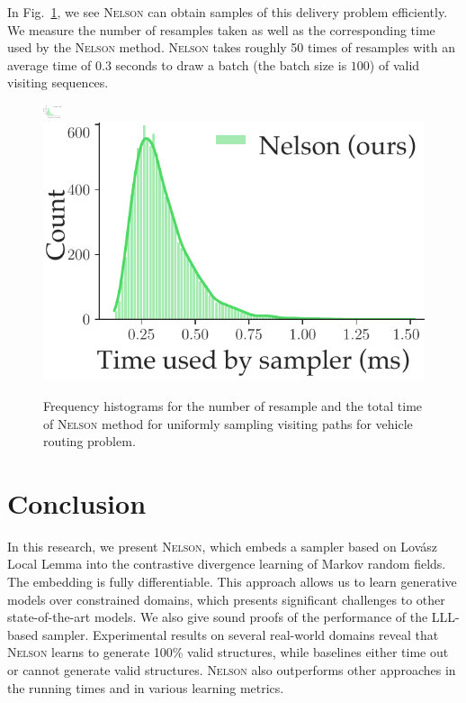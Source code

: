 \documentclass[letterpaper]{article} %
\newcommand{\lovasz}{{Lov\'asz}\xspace}
\newcommand{\nls}{\textsc{Nelson}\xspace}
\begin{document}
In Fig.~\ref{fig:route}, we see  \nls can obtain samples of this delivery problem efficiently. We measure the number of resamples taken as well as the corresponding time used  by the \nls method. \nls takes roughly 50 times of resamples with an average time of $0.3$ seconds to draw a batch (the batch size is $100$) of valid visiting sequences.

\begin{figure}[!t]
\centering
\includegraphics[width=0.074844\linewidth,height=0.15in ]{exp/sat/vehicle.resamples.pdf}
\includegraphics[width=0.495\linewidth]{exp/sat/vehicle.time.pdf}
\caption{Frequency histograms for the number of resample and the total time of \nls method for uniformly sampling visiting paths for vehicle routing problem.}
\label{fig:route}
\end{figure}

\vspace{-1.55mm}
\vspace{-3.10mm}
\section{Conclusion}
In this research, we present \nls, which  embeds a sampler based on \lovasz Local Lemma into the contrastive divergence learning of Markov random fields. The embedding is fully differentiable. This approach allows us to learn generative models over constrained domains, which presents significant challenges to other state-of-the-art models.
We also give sound proofs of the performance of the LLL-based sampler.
Experimental results on several real-world domains reveal that \nls learns to generate 100\% valid structures, while baselines either time out or cannot generate valid structures.
\nls also outperforms other approaches in the running times and in various learning metrics.



\vspace{-1.86mm}
\end{document}
